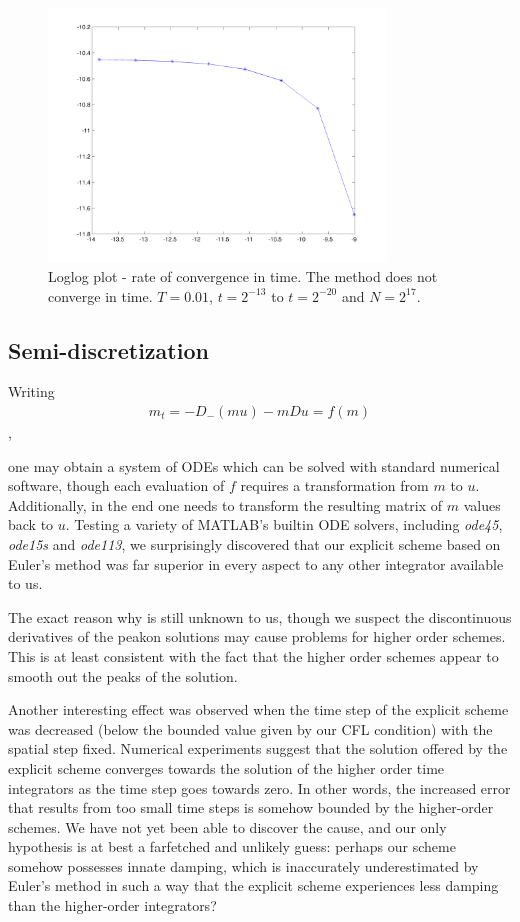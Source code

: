 \begin{figure}[h]
        \centering
        \includegraphics[width=0.8\textwidth]{gfx/loglog2time}
        \caption{Loglog plot - rate of convergence in time. The method does not converge in time. $T = 0.01$, $t = 2^{-13}$ to $ t = 2^{-20}$ and $N = 2^{17}$.}
        \label{fig:loglog2time}
\end{figure}



\subsection*{Semi-discretization}
Writing 
\begin{align*}
m_t = - D_- (m u) - m D u = f(m)
\end{align*},

one may obtain a system of ODEs which can be solved with standard numerical software, though each evaluation of $f$ requires a transformation from $m$ to $u$. Additionally, in the end one needs to transform the resulting matrix of $m$ values back to $u$. Testing a variety of MATLAB's builtin ODE solvers, including \emph{ode45}, \emph{ode15s} and \emph{ode113}, we surprisingly discovered that our explicit scheme based on Euler's method was far superior in every aspect to any other integrator available to us. 

The exact reason why is still unknown to us, though we suspect the discontinuous derivatives of the peakon solutions may cause problems for higher order schemes. This is at least consistent with the fact that the higher order schemes appear to smooth out the peaks of the solution.

Another interesting effect was observed when the time step of the explicit scheme was decreased (below the bounded value given by our CFL condition) with the spatial step fixed. Numerical experiments suggest that the solution offered by the explicit scheme converges towards the solution of the higher order time integrators as the time step goes towards zero. In other words, the increased error that results from too small time steps is somehow bounded by the higher-order schemes. We have not yet been able to discover the cause, and our only hypothesis is at best a farfetched and unlikely guess: perhaps our scheme somehow possesses innate damping, which is inaccurately underestimated by Euler's method in such a way that the explicit scheme experiences less damping than the higher-order integrators?